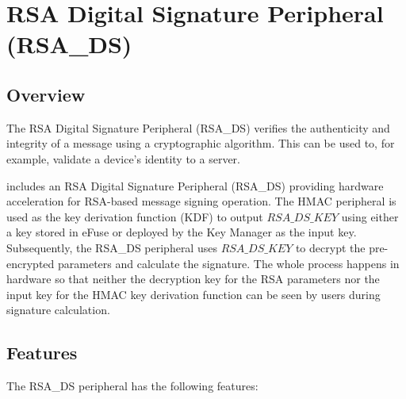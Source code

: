 \documentclass[main\_\_EN.tex]{subfiles}
\begin{document}
\setenglishformatting

\ifglobal
\else
    \clearpage
    \listoftodos
    \listofdonetodos
    \tableofcontents
\fi



\chapter{RSA Digital Signature Peripheral (RSA\_DS)}
\label{mod:rsads}
\hypertarget{digsig}{}\hypertarget{rsads}{}

\section{Overview}

The RSA Digital Signature Peripheral (RSA\_DS) verifies the authenticity and integrity of a message using a cryptographic algorithm. This can be used to, for example, validate a device's identity to a server.

\chipname{} includes an RSA Digital Signature Peripheral (RSA\_DS) providing hardware acceleration for RSA-based message signing operation. The HMAC peripheral is used as the key derivation function (KDF) to output \begin{math}RSA\_DS\_KEY\end{math} using either a key stored in eFuse or deployed by the Key Manager as the input key. Subsequently, the RSA\_DS peripheral uses \begin{math}RSA\_DS\_KEY\end{math} to decrypt the pre-encrypted parameters and calculate the signature. The whole process happens in hardware so that neither the decryption key for the RSA parameters nor the input key for the HMAC key derivation function can be seen by users during signature calculation.

\section{Features}

The RSA\_DS peripheral has the following features:
\end{document}
